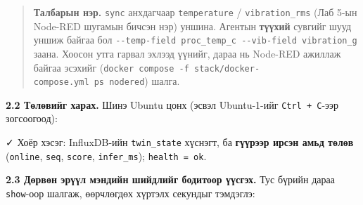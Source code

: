 \begin{Shaded}
\begin{Highlighting}[]
\end{Highlighting}
\end{Shaded}

\begin{quote}
\textbf{Талбарын нэр.} \texttt{sync} анхдагчаар \texttt{temperature} / \texttt{vibration\_rms} (Лаб 5-ын Node-RED шугамын бичсэн нэр) уншина. Агентын \textbf{түүхий} сувгийг шууд уншиж байгаа бол \texttt{-\/\allowbreak{}-temp-field\ proc\_\allowbreak{}temp\_\allowbreak{}c\ -\/\allowbreak{}-vib-field\ vibration\_\allowbreak{}g} заана. Хоосон утга гарвал эхлээд үүнийг, дараа нь Node-RED ажиллаж байгаа эсэхийг (\texttt{docker\ compose\ -f\ stack/\allowbreak{}docker-compose.\allowbreak{}yml\ ps\ nodered}) шалга.
\end{quote}

\textbf{2.2 Төлөвийг харах.} Шинэ Ubuntu цонх (эсвэл Ubuntu-1-ийг \texttt{Ctrl\ +\ C}-ээр зогсоогоод):

\begin{Shaded}
\begin{Highlighting}[]
\end{Highlighting}
\end{Shaded}

✓ Хоёр хэсэг: InfluxDB-ийн \texttt{twin\_state} хүснэгт, ба \textbf{гүүрээр ирсэн амьд төлөв} (\texttt{online}, \texttt{seq}, \texttt{score}, \texttt{infer\_ms}); \texttt{health\ =\ ok}.

\textbf{2.3 Дөрвөн эрүүл мэндийн шийдлийг бодитоор үүсгэх.} Тус бүрийн дараа \texttt{show}-оор шалгаж, өөрчлөгдөх хүртэлх секундыг тэмдэглэ:

